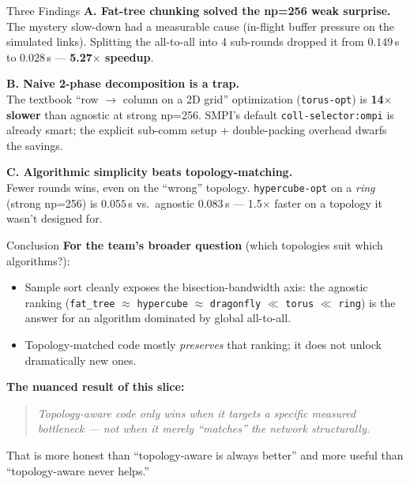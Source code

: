 \documentclass[10pt, aspectratio=169]{beamer}
\begin{document}
\begin{frame}{Three Findings}
\textbf{A. Fat-tree chunking solved the np=256 weak surprise.}\\
\quad The mystery slow-down had a measurable cause (in-flight buffer pressure
on the simulated links). Splitting the all-to-all into 4 sub-rounds dropped
it from $0.149\,$s to $0.028\,$s --- \textcolor{accentgreen}{\textbf{5.27$\times$ speedup}}.

\vspace{0.6em}
\textbf{B. Naive 2-phase decomposition is a trap.}\\
\quad The textbook ``row $\to$ column on a 2D grid'' optimization (\texttt{torus-opt})
is \textcolor{accentred}{\textbf{14$\times$ slower}} than agnostic at strong np=256.
SMPI's default \texttt{coll-selector:ompi} is already smart; the explicit
sub-comm setup + double-packing overhead dwarfs the savings.

\vspace{0.6em}
\textbf{C. Algorithmic simplicity beats topology-matching.}\\
\quad Fewer rounds wins, even on the ``wrong'' topology.
\texttt{hypercube-opt} on a \emph{ring} (strong np=256) is $0.055\,$s vs.\
agnostic $0.083\,$s --- 1.5$\times$ faster on a topology it wasn't
designed for.
\end{frame}

\begin{frame}{Conclusion}
\textbf{For the team's broader question} (which topologies suit which algorithms?):
\begin{itemize}
    \item Sample sort cleanly exposes the \alert{bisection-bandwidth axis}: the agnostic ranking (\texttt{fat\_tree} $\approx$ \texttt{hypercube} $\approx$ \texttt{dragonfly} $\ll$ \texttt{torus} $\ll$ \texttt{ring}) is the answer for an algorithm dominated by global all-to-all.
    \item Topology-matched code mostly \emph{preserves} that ranking; it does not unlock dramatically new ones.
\end{itemize}

\vspace{0.7em}
\textbf{The nuanced result of this slice:}
\begin{quote}
\itshape
Topology-aware code only wins when it targets a specific measured
bottleneck --- not when it merely ``matches'' the network structurally.
\end{quote}

\vspace{0.5em}
That is more honest than ``topology-aware is always better'' and more useful
than ``topology-aware never helps.''
\end{frame}
\end{document}
